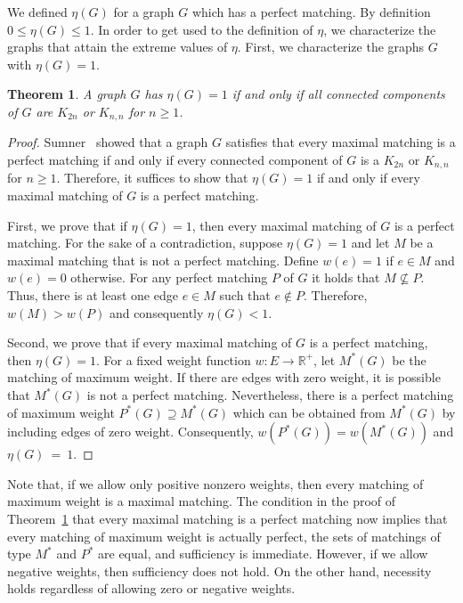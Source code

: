 \documentclass{article}
\newtheorem{thm}{Theorem}
\newcommand{\RE}{\mathbb{R}}			\newcommand{\ZZ}{\mathbb{Z}}			\newcommand{\OO}{\widetilde{O}}
\begin{document}
We defined $\eta(G)$ for a graph $G$ which has a perfect matching. By definition $0 \leq \eta(G) \leq 1$. In order to get used to the definition of $\eta$, we characterize the graphs that attain the extreme values of $\eta$. First, we characterize the graphs $G$ with $\eta(G) = 1$.

\begin{thm}
\label{thm:eta1}
A graph $G$ has $\eta(G) = 1$ if and only if all connected components of $G$ are $K_{2n}$ or $K_{n,n}$ for $n \geq 1$.
\end{thm}
\begin{proof}
Sumner~\cite{sumner79} showed that a graph $G$ satisfies that every maximal matching is a perfect matching if and only if every connected component of $G$ is a $K_{2n}$ or $K_{n,n}$ for $n \geq 1$. Therefore, it suffices to show that $\eta(G)=1$ if and only if every maximal matching of $G$ is a perfect matching.

First, we prove that if $\eta(G) = 1$, then every maximal matching of $G$ is a perfect matching. For the sake of a contradiction, suppose $\eta(G) = 1$ and let $M$ be a maximal matching that is not a perfect matching. Define $w(e) = 1$ if $e \in M$ and $w(e) = 0$ otherwise. For any perfect matching $P$ of $G$ it holds that $M \not\subseteq P$. Thus, there is at least one edge $e \in M$ such that $e \not \in P$. Therefore, $w(M) > w(P)$ and consequently $\eta(G) < 1$.

Second, we prove that if every maximal matching of $G$ is a perfect matching, then $\eta(G) = 1$. For a fixed weight function $w : E \rightarrow \RE^+$, let $M^*(G)$ be the matching of maximum weight. If there are edges with zero weight, it is possible that $M^*(G)$ is not a perfect matching. Nevertheless, there is a perfect matching of maximum weight $P^*(G) \supseteq M^*(G)$ which can be obtained from $M^*(G)$ by including edges of zero weight. Consequently, $w(P^*(G)) = w(M^*(G))$ and $\eta(G)~=~1$.
\end{proof}

Note that, if we allow only positive nonzero weights, then every matching of maximum weight is a maximal matching.
The condition in the proof of Theorem~\ref{thm:eta1} that every maximal matching is a perfect matching now implies that every matching of maximum weight is actually perfect, the sets of matchings of type $M^*$ and $P^*$ are equal, and sufficiency is immediate.
However, if we allow negative weights, then sufficiency does not hold.
On the other hand, necessity holds regardless of allowing zero or negative weights.
\end{document}

